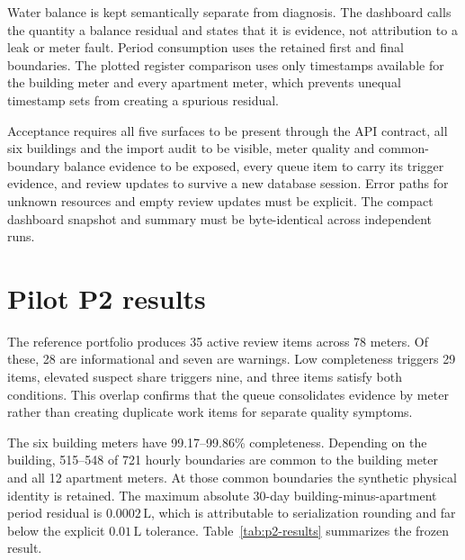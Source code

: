 \documentclass[11pt,a4paper]{article}
\begin{document}
Water balance is kept semantically separate from diagnosis. The dashboard calls
the quantity a balance residual and states that it is evidence, not attribution
to a leak or meter fault. Period consumption uses the retained first and final
boundaries. The plotted register comparison uses only timestamps available for
the building meter and every apartment meter, which prevents unequal timestamp
sets from creating a spurious residual.

Acceptance requires all five surfaces to be present through the API contract,
all six buildings and the import audit to be visible, meter quality and common-
boundary balance evidence to be exposed, every queue item to carry its trigger
evidence, and review updates to survive a new database session. Error paths for
unknown resources and empty review updates must be explicit. The compact
dashboard snapshot and summary must be byte-identical across independent runs.

\section{Pilot P2 results}
The reference portfolio produces 35 active review items across 78 meters. Of
these, 28 are informational and seven are warnings. Low completeness triggers
29 items, elevated suspect share triggers nine, and three items satisfy both
conditions. This overlap confirms that the queue consolidates evidence by meter
rather than creating duplicate work items for separate quality symptoms.

The six building meters have 99.17--99.86\% completeness. Depending on the
building, 515--548 of 721 hourly boundaries are common to the building meter and
all 12 apartment meters. At those common boundaries the synthetic physical
identity is retained. The maximum absolute 30-day building-minus-apartment
period residual is $0.0002\,\mathrm{L}$, which is attributable to serialization
rounding and far below the explicit $0.01\,\mathrm{L}$ tolerance. Table~\ref{tab:p2-results}
summarizes the frozen result.
\end{document}
